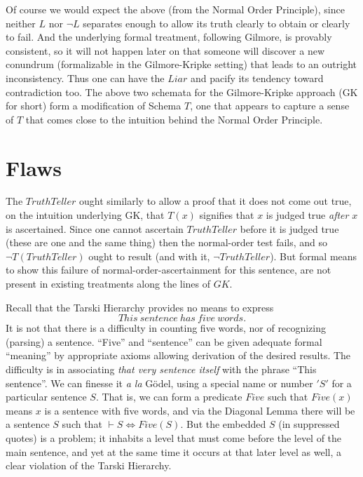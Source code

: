 \documentclass{amsart}
\begin{document}
Of course we would expect the above (from the Normal Order Principle),
since neither $L$ nor $\neg L$ separates enough to allow its truth clearly
to obtain or clearly to fail.  And the underlying formal treatment, following
Gilmore, is provably consistent, so it will not happen later on that
someone will discover a new conundrum (formalizable in the
Gilmore-Kripke setting) that leads to an outright inconsistency.
Thus one can have the $Liar$ and pacify its tendency toward
contradiction too.  The above two schemata for the Gilmore-Kripke
approach (GK for short) form a modification of Schema $T$, one that appears to
capture a sense of $T$ that comes close to the intuition behind the
Normal Order Principle.

\section{Flaws}

The $TruthTeller$  ought similarly to allow a proof that it does not
come out true, on the intuition underlying GK, that $T(x)$ signifies
that $x$ is judged true {\em after} $x$ is ascertained. Since one cannot
ascertain $TruthTeller$ before it is judged true (these are one and
the same thing) then the normal-order test fails, and so $\neg
T(TruthTeller)$ ought to result (and with it, $\neg TruthTeller$). But
formal means to show this failure of normal-order-ascertainment for
this sentence, are not present in existing treatments along the lines
of $GK$. 

Recall that the Tarski Hierarchy provides no means to express
$$This~ sentence~ has~ five~ words.$$
It is not that there is a difficulty in counting five words, nor of
recognizing (parsing) 
a sentence. ``Five'' and ``sentence'' can be given adequate formal
``meaning'' by appropriate axioms allowing derivation of the desired
results.  The difficulty is in associating {\em that very sentence
itself} with
the phrase ``This sentence''.  We can finesse it {\em a la} G\"odel,
using a special name or number $'S'$ for a particular sentence $S$.
That is, we can form a predicate $Five$ 
such that $Five(x)$ means $x$ is a sentence with five words, and via the
Diagonal Lemma there will be a sentence $S$ such that 
$\vdash S \iff Five(S)$. But the embedded $S$ (in suppressed quotes)
is a problem; it inhabits a level that must come
before the level of the main sentence, and yet at the same time it
occurs at that later level as well, a clear violation of the Tarski
Hierarchy.
\end{document}

